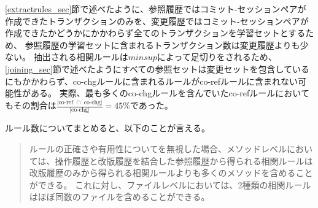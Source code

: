 \documentclass[a4paper]{jsbook}
\begin{document}
\ref{extractrules_sec}節で述べたように、参照履歴ではコミット-セッションペアが作成できたトランザクションのみを、変更履歴ではコミット-セッションペアが作成できたかどうかにかかわらず全てのトランザクションを学習セットとするため、
参照履歴の学習セットに含まれるトランザクション数は変更履歴よりも少ない。
抽出される相関ルールは$minsup$によって足切りをされるため、\ref{joining_sec}節で述べたようにすべての参照セットは変更セットを包含しているにもかかわらず、co-chgルールに含まれるルールがco-refルールに含まれない可能性がある。
実際、最も多くのco-chgルールを含んでいたco-refルールにおいてもその割合は$\frac{|\textrm{co-ref~} \cap \textrm{~co-chg}|}{|\textrm{co-chg}|}=45\%$であった。

ルール数についてまとめると、以下のことが言える。
\begin{quote}
ルールの正確さや有用性についてを無視した場合、メソッドレベルにおいては、操作履歴と改版履歴を結合した参照履歴から得られる相関ルールは改版履歴のみから得られる相関ルールよりも多くのメソッドを含めることができる。
これに対し、ファイルレベルにおいては、2種類の相関ルールはほぼ同数のファイルを含めることができる。
\end{quote}
\end{document}
